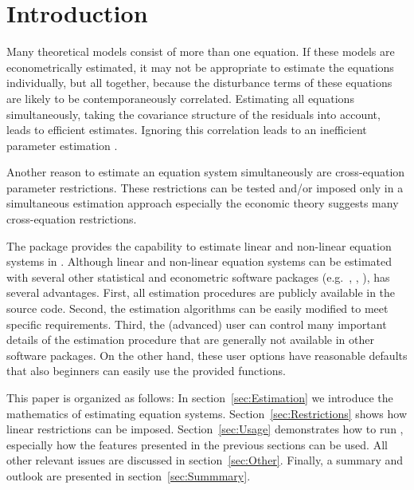 


\section{Introduction}

Many theoretical models consist of more than one equation. If these
models are econometrically estimated, it may not be appropriate to
estimate the equations individually, but all together, because the
disturbance terms of these equations are likely to be contemporaneously
correlated. %
Estimating all equations simultaneously, taking the
covariance structure of the residuals into account, leads to efficient
estimates.
Ignoring this correlation leads to an inefficient
parameter estimation \citep{zellner62}.

Another reason to estimate an equation system simultaneously are
cross-equation parameter restrictions. These restrictions can be
tested and/or imposed only in a simultaneous estimation
approach especially the economic theory suggests many cross-equation
restrictions.

The  package provides the capability to estimate
linear and non-linear equation systems in .
Although linear and non-linear equation systems can be estimated
with several other statistical and econometric software packages
(e.g.\ , , ),
 has several advantages.
First, all estimation procedures are publicly available in the source code.
Second, the estimation algorithms can be easily modified to meet specific
requirements.
Third, the (advanced) user can control many important details of the
estimation procedure that are generally not available in other software
packages.
On the other hand, these user options have reasonable defaults that also
beginners can easily use the provided functions.

This paper is organized as follows: In section~\ref{sec:Estimation} we
introduce the mathematics of estimating equation systems.
Section~\ref{sec:Restrictions} shows how linear restrictions can be
imposed.
Section~\ref{sec:Usage} demonstrates how to run
, especially how the features presented in the previous
sections can be used.
All other relevant issues are discussed in section~\ref{sec:Other}.
Finally, a summary and outlook are presented in
section~\ref{sec:Summmary}.


